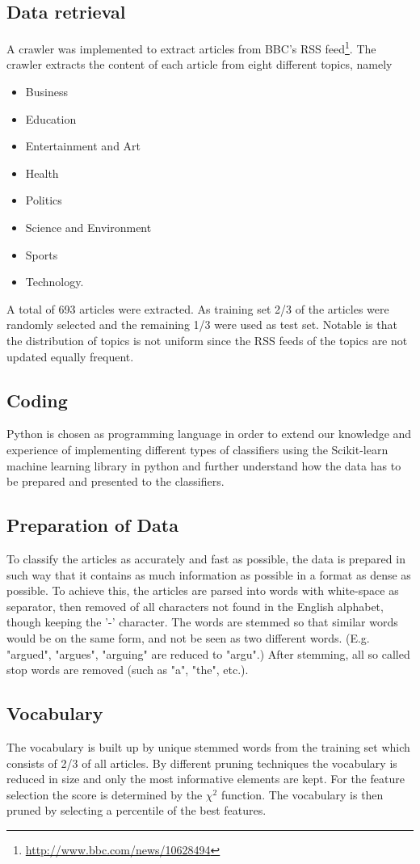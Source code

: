 \subsection{Data retrieval}
A crawler was implemented to extract articles from BBC's RSS feed\footnote{\url{http://www.bbc.com/news/10628494}}. The crawler extracts the content of each article from eight different topics, namely
\begin{itemize}[noitemsep,nolistsep]
	\item Business
	\item Education
	\item Entertainment and Art
	\item Health
	\item Politics
	\item Science and Environment
	\item Sports
	\item Technology.
\end{itemize}
A total of 693 articles were extracted. As training set 2/3 of the articles were randomly selected and the remaining 1/3 were used as test set. Notable is that the distribution of topics is not uniform since the RSS feeds of the topics are not updated equally frequent. 
\subsection{Coding}
Python is chosen as programming language in order to extend our knowledge and experience of implementing different types of classifiers using the Scikit-learn machine learning library in python and further understand how the data has to be prepared and presented to the classifiers.
\subsection{Preparation of Data}
To classify the articles as accurately and fast as possible, the data is prepared in such way that it contains as much information as possible in a format as dense as possible. To achieve this, the articles are parsed into words with white-space as separator, then removed of all characters not found in the English alphabet, though keeping the '-' character. The words are stemmed so that similar words would be on the same form, and not be seen as two different words. (E.g. "argued", "argues", "arguing" are reduced to "argu".) After stemming, all so called stop words are removed (such as "a", "the", etc.). 
\subsection{Vocabulary}
The vocabulary is built up by unique stemmed words from the training set which consists of 2/3 of all articles. By different pruning techniques the vocabulary is reduced in size and only the most informative elements are kept. For the feature selection the score is determined by the $\chi^2$ function. The vocabulary is then pruned by selecting a percentile of the best features.
